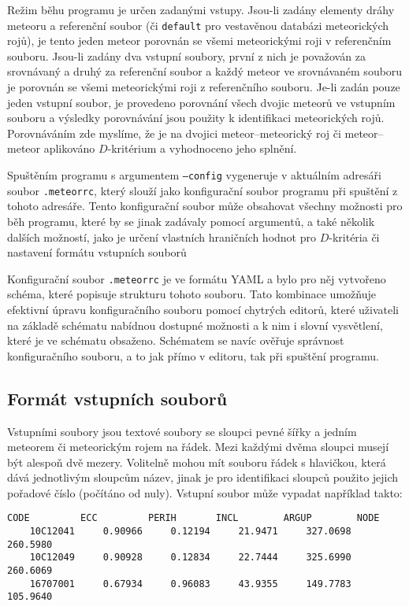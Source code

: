 Režim běhu programu je určen zadanými vstupy. Jsou-li zadány elementy dráhy meteoru a referenční soubor (či \texttt{default} pro vestavěnou databázi meteorických rojů), je tento jeden meteor porovnán se všemi meteorickými roji v referenčním souboru. Jsou-li zadány dva vstupní soubory, první z nich je považován za srovnávaný a druhý za referenční soubor a každý meteor ve srovnávaném souboru je porovnán se všemi meteorickými roji z referenčního souboru. Je-li zadán pouze jeden vstupní soubor, je provedeno porovnání všech dvojic meteorů ve vstupním souboru a výsledky porovnávání jsou použity k identifikaci meteorických rojů. Porovnáváním zde myslíme, že je na dvojici meteor--meteorický roj či meteor--meteor aplikováno $D$-kritérium a vyhodnoceno jeho splnění.

\medskip

Spuštěním programu s argumentem \texttt{---config} vygeneruje v aktuálním adresáři soubor \texttt{.meteorrc}, který slouží jako konfigurační soubor programu při spuštění z tohoto adresáře. Tento konfigurační soubor může obsahovat všechny možnosti pro běh programu, které by se jinak zadávaly pomocí argumentů, a také několik dalších možností, jako je určení vlastních hraničních hodnot pro $D$-kritéria či nastavení formátu vstupních souborů

Konfigurační soubor \texttt{.meteorrc} je ve formátu YAML a bylo pro něj vytvořeno schéma, které popisuje strukturu tohoto souboru. Tato kombinace umožňuje efektivní úpravu konfiguračního souboru pomocí chytrých editorů, které uživateli na základě schématu nabídnou dostupné možnosti a k nim i slovní vysvětlení, které je ve schématu obsaženo. Schématem se navíc ověřuje správnost konfiguračního souboru, a to jak přímo v editoru, tak při spuštění programu.

\subsection{Formát vstupních souborů}%
Vstupními soubory jsou textové soubory se sloupci pevné šířky a jedním meteorem či meteorickým rojem na řádek. Mezi každými dvěma sloupci musejí být alespoň dvě mezery. Volitelně mohou mít souboru řádek s hlavičkou, která dává jednotlivým sloupcům název, jinak je pro identifikaci sloupců použito jejich pořadové číslo (počítáno od nuly). Vstupní soubor může vypadat například takto:
\begin{Verbatim}[commandchars=\\\{\},gobble=4,formatcom=\footnotesize,codes={\catcode`$=3\catcode`^=7},frame=lines,reflabel=code:practical:input,label=DAT]
    CODE         ECC         PERIH       INCL        ARGUP        NODE
    10C12041     0.90966     0.12194     21.9471     327.0698     260.5980
    10C12049     0.90928     0.12834     22.7444     325.6990     260.6069
    16707001     0.67934     0.96083     43.9355     149.7783     105.9640
\end{Verbatim}

